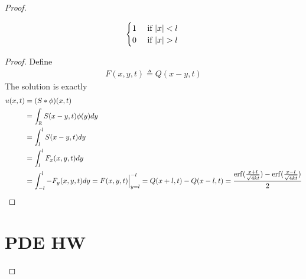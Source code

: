 \documentclass{report}
\begin{document}
\begin{proof}
\begin{question}{}{}
\begin{align*}
\begin{cases}
 1& \text{ if $\abso{x}<l$ }\\
 0& \text{ if $\abso{x}>l$ } 
\end{cases}
\end{align*}
\end{question}
\begin{proof}
Define 
\begin{align*}
F(x,y,t)\triangleq Q(x-y,t)
\end{align*}
The solution is exactly 
\begin{align*}
u(x,t)&= (S*\phi )(x,t)\\
&=\int_{\mathbb{R}}S(x-y,t)\phi (y)dy \\
&=\int_{l}^{l} S(x-y,t)dy \\
&=\int_{l}^{l}F_x(x,y,t)dy \\
&=\int_{-l}^{l}-F_y(x,y,t)dy=F(x,y,t)\Big|_{y=l}^{-l}=Q(x+l,t)-Q(x-l,t)=\frac{\operatorname{erf}(\frac{x+l}{\sqrt{4kt}})-\operatorname{erf}(\frac{x-l}{\sqrt{4kt}})}{2}
\end{align*}
\end{proof}
\chapter{PDE HW}

\end{proof}
\end{document}
